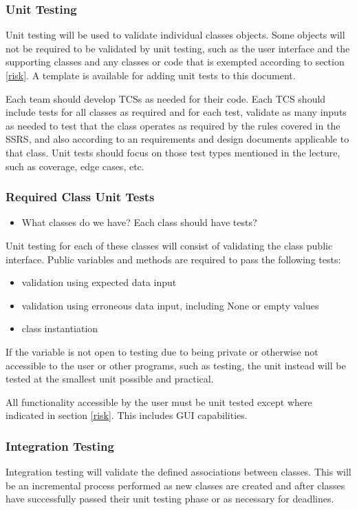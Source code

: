 \documentclass[report]{article}
\begin{document}
\subsubsection{Unit Testing}
Unit testing will be used to validate individual classes objects. Some objects will not be required to be validated by unit testing, such as the user interface and the supporting classes and any classes or code that is exempted according to section \ref{risk}. A template is available for adding unit tests to this document.

Each team should develop TCSs as needed for their code. Each TCS should include tests for all classes as required and for each test, validate as many inputs as needed to test that the class operates as required by the rules covered in the SSRS, and also according to an requirements and design documents applicable to that class. Unit tests should focus on those test types mentioned in the lecture, such as coverage, edge cases, etc.

\subsubsection{Required Class Unit Tests}
\begin{itemize}
\item What classes do we have? Each class should have tests?
\end{itemize}
Unit testing for each of these classes will consist of validating the class public interface. Public variables and methods are required to pass the following tests:
\begin{itemize}
\item validation using expected data input
\item validation using erroneous data input, including None or empty values
\item class instantiation
\end{itemize}

If the variable is not open to testing due to being private or otherwise not accessible to the user or other programs, such as testing, the unit instead will be tested at the smallest unit possible and practical.

All functionality accessible by the user must be unit tested except where indicated in section \ref{risk}. This includes GUI capabilities. 

\subsubsection{Integration Testing}
Integration testing will validate the defined associations between classes. This will be an incremental process performed as new classes are created and after classes have successfully passed their unit testing phase or as necessary for deadlines. 
\end{document}
